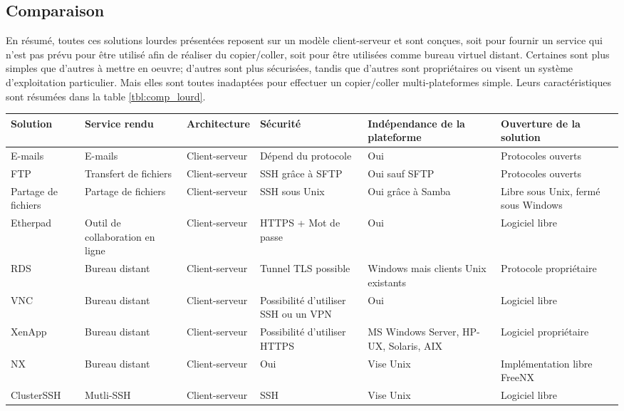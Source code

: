 \subsection{Comparaison}
En résumé, toutes ces solutions lourdes présentées reposent
sur un modèle client-serveur et sont conçues, soit pour fournir un service
qui n'est pas prévu pour être utilisé afin de réaliser du copier/coller,
soit pour être utilisées comme bureau virtuel distant. Certaines sont
plus simples que d'autres à mettre en oeuvre; d'autres sont plus sécurisées,
tandis que d'autres sont propriétaires ou visent un système d'exploitation
particulier. Mais elles sont toutes inadaptées pour effectuer
un copier/coller multi-plateformes simple. Leurs caractéristiques sont résumées
dans la table \ref{tbl:comp_lourd}.

\begin{sidewaystable}[!h]
  \centering
  \begin{tabular}{|l|l|l|m{7em}|m{7em}|m{7em}|}
    \hline
    Solution & Service rendu & Architecture & Sécurité & In\-dé\-pen\-dance
    de la plateforme & Ouverture de la solution \\
    \hline
    \hline
    E-mails & E-mails & Client-serveur & Dépend du protocole & Oui &
    Protocoles ouverts \\
    \hline
    FTP & Transfert de fichiers & Client-serveur & SSH grâce à SFTP & Oui
    sauf SFTP & Protocoles ouverts \\
    \hline
    Partage de fichiers & Partage de fichiers & Client-serveur & SSH sous
    Unix & Oui grâce à Samba & Libre sous Unix, fermé sous Windows \\
    \hline
    Etherpad & Outil de collaboration en ligne & Client-serveur &
    HTTPS + Mot de passe & Oui & Logiciel libre \\
    \hline
    RDS & Bureau distant & Client-serveur & Tunnel TLS possible & Windows
    mais clients Unix existants & Protocole propriétaire\\
    \hline
    VNC & Bureau distant & Client-serveur & Possibilité d'utiliser SSH ou un
    VPN & Oui & Logiciel libre \\
    \hline
    XenApp & Bureau distant & Client-serveur & Possibilité d'utiliser HTTPS &
    MS Windows Server, HP-UX, Solaris, AIX & Logiciel propriétaire \\
    \hline
    NX & Bureau distant & Client-serveur & Oui & Vise Unix &
    Im\-plé\-men\-ta\-tion libre FreeNX \\
    \hline
    ClusterSSH & Mutli-SSH & Client-serveur & SSH & Vise Unix &
    Logiciel libre \\
    \hline
  \end{tabular}
  \caption{\label{tbl:comp_lourd} Comparaison des solutions lourdes}
\end{sidewaystable}
\clearpage

